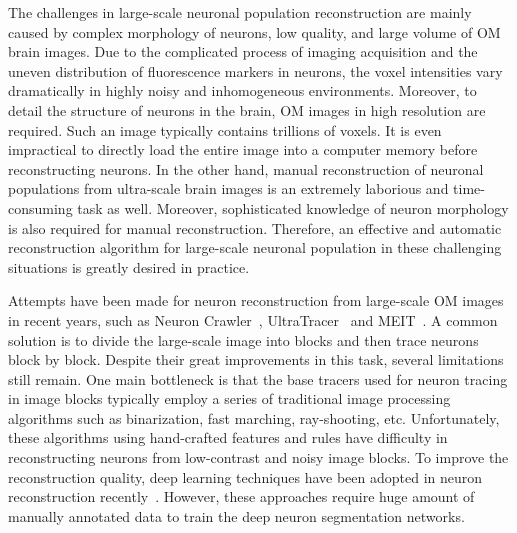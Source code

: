 The challenges in large-scale neuronal population reconstruction are mainly caused by complex morphology of neurons, low quality, and large volume of OM brain images.
Due to the complicated process of imaging acquisition and the uneven distribution of fluorescence markers in neurons, the voxel intensities vary dramatically in highly noisy and inhomogeneous environments.
Moreover, to detail the structure of neurons in the brain, OM images in high resolution are required. Such an image typically contains trillions of voxels. It is even impractical to directly load the entire image into a computer memory before reconstructing neurons.
In the other hand, manual reconstruction of neuronal populations from ultra-scale brain images is an extremely laborious and time-consuming task as well.
Moreover, sophisticated knowledge of neuron morphology is also required for manual reconstruction.
%
Therefore, an effective and automatic reconstruction algorithm for large-scale neuronal population in these challenging situations is greatly desired in practice.
 
 
Attempts have been made for neuron reconstruction from large-scale OM images in recent years, such as Neuron Crawler~\cite{Zhou2015}, UltraTracer~\cite{Peng2017} and MEIT~\cite{Wang2018}.
A common solution is to divide the large-scale image into blocks and then trace neurons block by block.
Despite their great improvements in this task, several limitations still remain.
%
One main bottleneck is that the base tracers used for neuron tracing in image blocks typically employ a series of traditional image processing algorithms such as binarization, fast marching, ray-shooting, etc. 
Unfortunately, these algorithms using hand-crafted features and rules have difficulty in reconstructing neurons from low-contrast and noisy image blocks.
To improve the reconstruction quality, deep learning techniques have been adopted in neuron reconstruction recently~\cite{Xu2016, Li2017, Zhou2018, Kozinski-MIA2020}. 
However, these approaches require huge amount of manually annotated data to train the deep neuron segmentation networks.
%

